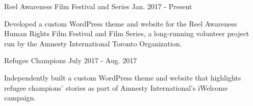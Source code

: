 

\begin{cventries}

  \cventry
    {Reel Awareness Film Festival and Series} %
    {} %
    {} %
    {Jan. 2017 - Present} %
    {
      \begin{cvitems} %
        \item {Developed a custom WordPress theme and website for the Reel Awareness Human Rights Film Festival and Film Series, a long-running volunteer project run by the Amnesty International Toronto Organization.}
      \end{cvitems}
    }

  \cventry
    {Refugee Champions} %
    {} %
    {} %
    {July 2017 - Aug. 2017} %
    {
      \begin{cvitems} %
        \item {Independently built a custom WordPress theme and website that highlights refugee champions’ stories as part of Amnesty International’s iWelcome campaign.}
      \end{cvitems}
    }

\end{cventries}
